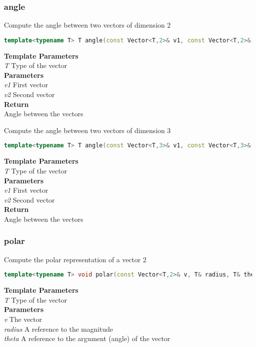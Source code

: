 \subsubsection{angle}
\begin{mdframed}
Compute the angle between two vectors of dimension 2
\begin{lstlisting}[language=C++]
template<typename T> T angle(const Vector<T,2>& v1, const Vector<T,2>& v2) 
\end{lstlisting}
\textbf{Template Parameters} \\ 
\textit{T} Type of the vector \\ 
\textbf{Parameters} \\ 
\textit{v1} First vector \\ 
\textit{v2} Second vector \\ 
\textbf{Return} \\ 
Angle between the vectors\\ 
\end{mdframed}

\begin{mdframed}
Compute the angle between two vectors of dimension 3
\begin{lstlisting}[language=C++]
template<typename T> T angle(const Vector<T,3>& v1, const Vector<T,3>& v2) 
\end{lstlisting}
\textbf{Template Parameters} \\ 
\textit{T} Type of the vector \\ 
\textbf{Parameters} \\ 
\textit{v1} First vector \\ 
\textit{v2} Second vector \\ 
\textbf{Return} \\ 
Angle between the vectors\\ 
\end{mdframed}

\subsubsection{polar}
\begin{mdframed}
Compute the polar representation of a vector 2
\begin{lstlisting}[language=C++]
template<typename T> void polar(const Vector<T,2>& v, T& radius, T& theta) 
\end{lstlisting}
\textbf{Template Parameters} \\ 
\textit{T} Type of the vector \\ 
\textbf{Parameters} \\ 
\textit{v} The vector \\ 
\textit{radius} A reference to the magnitude \\ 
\textit{theta} A reference to the argument (angle) of the vector \\ 
\end{mdframed}


